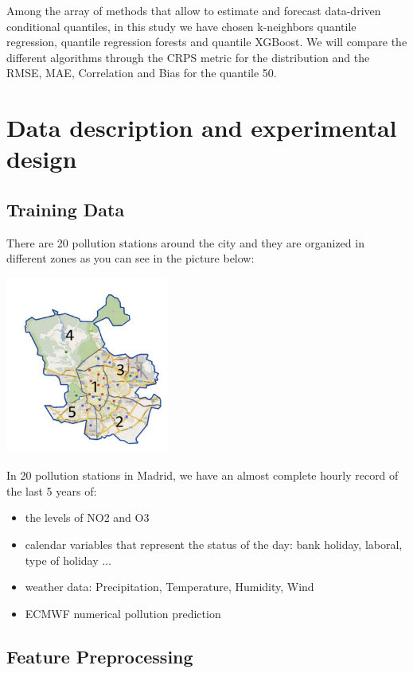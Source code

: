 \documentclass[a4paper,twocolumn,5p]{elsarticle}
\begin{document}
Among the array of methods that allow to estimate and forecast
data-driven conditional quantiles, in this study we have chosen
k-neighbors quantile regression, quantile regression forests and quantile XGBoost. 
We will compare the different algorithms through the CRPS metric for the 
distribution and the RMSE, MAE, Correlation and Bias for the quantile 50.

\section{Data description and experimental design}

\subsection{Training Data}

There are 20 pollution stations around the city and they are organized in different
zones as you can see in the picture below:

\includegraphics[width=0.4\textwidth]{zonas_madrid}


In 20 pollution stations in Madrid, we have an almost complete hourly record of the last 5 years of:
\begin{itemize}
  \item the levels of NO2 and O3
  \item calendar variables that represent the status of the day: bank holiday, laboral, type of holiday ...
  \item weather data: Precipitation, Temperature, Humidity, Wind
  \item ECMWF numerical pollution prediction
\end{itemize} 

\subsection{Feature Preprocessing}
\end{document}
